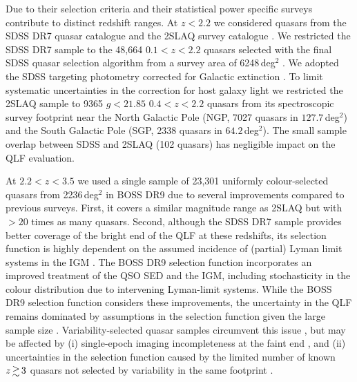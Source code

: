 \documentclass[fleqn,usenatbib]{mnras}
\newcommand{\new}[1]{{\color{notecolor} #1}}
\begin{document}
Due to their selection criteria and their statistical power specific
surveys contribute to distinct redshift ranges. At $z<2.2$ we
considered quasars from the SDSS DR7 quasar catalogue
\citep{2010AJ....139.2360S} and the 2SLAQ survey catalogue
\citep{2009MNRAS.392...19C}. We restricted the SDSS DR7 sample to the
48,664 $0.1<z<2.2$ quasars selected with the final SDSS quasar
selection algorithm \citep{2002AJ....123.2945R, 2006AJ....131.2766R}
from a survey area of 6248\,deg$^2$ \citep{2012ApJ...746..169S}. We
adopted the SDSS targeting photometry corrected for Galactic
extinction \citep{2010AJ....139.2360S}. To limit systematic
uncertainties in the correction for host galaxy light \citep[detailed
  in][]{2009MNRAS.392...19C} we restricted the 2SLAQ sample to 9365
$g<21.85$ $0.4<z<2.2$ quasars from its spectroscopic survey footprint
near the North Galactic Pole (NGP, 7027 quasars in $127.7$\,deg$^2$)
and the South Galactic Pole (SGP, 2338 quasars in
$64.2$\,deg$^2$). The small sample overlap between SDSS and 2SLAQ (102
quasars) has negligible impact on the QLF evaluation.

At $2.2<z<3.5$ we used a single sample of 23,301 uniformly
colour-selected quasars from 2236\,deg$^2$ in BOSS DR9
\citep{2013ApJ...773...14R} due to several improvements compared to
previous surveys. First, it covers a similar magnitude range as 2SLAQ
but with $>20$ times as many quasars. Second, although the SDSS DR7
sample provides better coverage of the bright end of the QLF at these
redshifts, its selection function is highly dependent on the assumed
incidence of (partial) Lyman limit systems in the IGM
\citep{2009ApJ...705L.113P, 2011ApJ...728...23W}.  \new{The BOSS DR9
selection function incorporates an improved treatment of the QSO SED
and the IGM, including stochasticity in the colour distribution due to
intervening Lyman-limit systems.}  While the BOSS DR9 selection
function considers these improvements, the uncertainty in the QLF
remains dominated by assumptions in the selection function given the
large sample size \citep{2013ApJ...773...14R}.  Variability-selected
quasar samples circumvent this issue \citep{2013ApJ...773...14R,
  2013A&A...551A..29P, 2016A&A...587A..41P}, but may be affected by
(i) single-epoch imaging incompleteness at the faint end
\citep{2013ApJ...773...14R}, and (ii) uncertainties in the selection
function caused by the limited number of known $z\ga 3$ quasars not
selected by variability in the same footprint
\citep{2013A&A...551A..29P, 2016A&A...587A..41P}.
\end{document}
